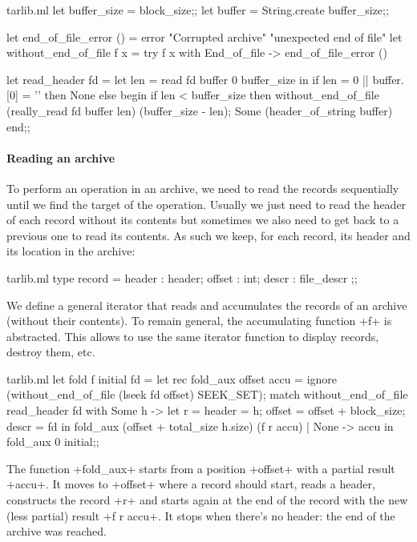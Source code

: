 %
\begin{listingcodefile}{tarlib.ml}
let buffer_size = block_size;;
let buffer = String.create buffer_size;;

let end_of_file_error () = 
  error "Corrupted archive" "unexpected end of file"
let without_end_of_file f x = 
  try f x with End_of_file -> end_of_file_error ()
      
let read_header fd = 
  let len = read fd buffer 0 buffer_size in
  if len = 0 ||  buffer.[0] = '' then None
  else begin
    if len < buffer_size then 
      without_end_of_file (really_read fd buffer len) (buffer_size - len);
    Some (header_of_string buffer)
  end;;
\end{listingcodefile}

\paragraph{Reading an archive}
To perform an operation in an archive, we need to read the records
sequentially until we find the target of the operation. Usually we
just need to read the header of each record without its contents but
sometimes we also need to get back to a previous one to read its
contents. As such we keep, for each record, its header and its location
in the archive:
%
\begin{listingcodefile}{tarlib.ml}
type record = { header : header; offset : int; descr : file_descr };;
\end{listingcodefile}
% 
We define a general iterator that reads and accumulates the records
of an archive (without their contents). To remain general, the
accumulating function \ml+f+ is abstracted. This allows to use the 
same iterator function to display records, destroy them, etc.  
%
\begin{listingcodefile}{tarlib.ml}
let fold f initial fd  =
  let rec fold_aux offset accu = 
    ignore (without_end_of_file (lseek fd offset) SEEK_SET);
    match without_end_of_file read_header fd with
      Some h -> 
        let r = 
          { header = h; offset = offset + block_size; descr = fd } in
        fold_aux (offset + total_size h.size) (f r accu) 
    | None -> accu in
  fold_aux 0 initial;;
\end{listingcodefile}
%
The function \ml+fold_aux+ starts from a position \ml+offset+ with a
partial result \ml+accu+. It moves to \ml+offset+ where a record
should start, reads a header, constructs the record \ml+r+ and starts
again at the end of the record with the new (less partial) result
\ml+f r accu+. It stops when there's no header: the end of the archive
was reached.

